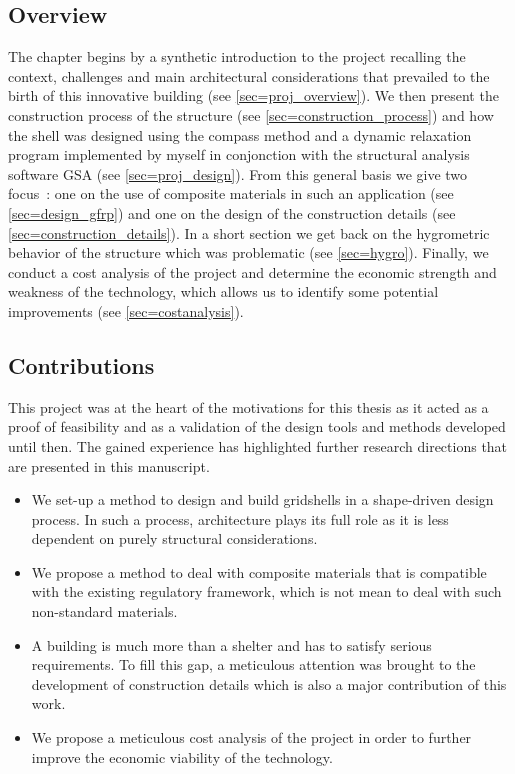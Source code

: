 \subsection{Overview}

The chapter begins by a synthetic introduction to the project recalling the context, challenges and main architectural considerations that prevailed to the birth of this innovative building (see \cref{sec=proj_overview}). We then present the construction process of the structure (see \cref{sec=construction_process}) and how the shell was designed using the compass method and a dynamic relaxation program implemented by myself in conjonction with the structural analysis software GSA (see \cref{sec=proj_design}). From this general basis we give two focus~: one on the use of composite materials in such an application (see \cref{sec=design_gfrp}) and one on the design of the construction details (see \cref{sec=construction_details}). In a short section we get back on the hygrometric behavior of the structure which was problematic (see \cref{sec=hygro}). Finally, we conduct a cost analysis of the project and determine the economic strength and weakness of the technology, which allows us to identify some potential improvements (see \cref{sec=costanalysis}).

\subsection{Contributions}

This project was at the heart of the motivations for this thesis as it acted as a proof of feasibility and as a validation of the design tools and methods developed until then. The gained experience has highlighted further research directions that are presented in this manuscript.

\begin{itemize}
\item We set-up a method to design and build gridshells in a shape-driven design process. In such a process, architecture plays its full role as it is less dependent on purely structural considerations.
\item We propose a method to deal with composite materials that is compatible with the existing regulatory framework, which is not mean to deal with such non-standard materials.
\item A building is much more than a shelter and has to satisfy serious requirements. To fill this gap, a meticulous attention was brought to the development of construction details which is also a major contribution of this work.
\item We propose a meticulous cost analysis of the project in order to further improve the economic viability of the technology.
\end{itemize}

